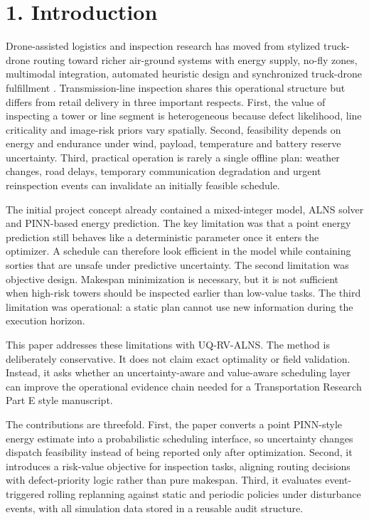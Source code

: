 \documentclass[preprint,12pt]{elsarticle}
\begin{document}
\section{1. Introduction}

Drone-assisted logistics and inspection research has moved from stylized truck-drone routing toward richer air-ground systems with energy supply, no-fly zones, multimodal integration, automated heuristic design and synchronized truck-drone fulfillment \cite{kim2026bidirectional,liu2026evtol,zhang2026airground,shi2026llm,yang2025integrated}. Transmission-line inspection shares this operational structure but differs from retail delivery in three important respects. First, the value of inspecting a tower or line segment is heterogeneous because defect likelihood, line criticality and image-risk priors vary spatially. Second, feasibility depends on energy and endurance under wind, payload, temperature and battery reserve uncertainty. Third, practical operation is rarely a single offline plan: weather changes, road delays, temporary communication degradation and urgent reinspection events can invalidate an initially feasible schedule.

The initial project concept already contained a mixed-integer model, ALNS solver and PINN-based energy prediction. The key limitation was that a point energy prediction still behaves like a deterministic parameter once it enters the optimizer. A schedule can therefore look efficient in the model while containing sorties that are unsafe under predictive uncertainty. The second limitation was objective design. Makespan minimization is necessary, but it is not sufficient when high-risk towers should be inspected earlier than low-value tasks. The third limitation was operational: a static plan cannot use new information during the execution horizon.

This paper addresses these limitations with UQ-RV-ALNS. The method is deliberately conservative. It does not claim exact optimality or field validation. Instead, it asks whether an uncertainty-aware and value-aware scheduling layer can improve the operational evidence chain needed for a Transportation Research Part E style manuscript.

The contributions are threefold. First, the paper converts a point PINN-style energy estimate into a probabilistic scheduling interface, so uncertainty changes dispatch feasibility instead of being reported only after optimization. Second, it introduces a risk-value objective for inspection tasks, aligning routing decisions with defect-priority logic rather than pure makespan. Third, it evaluates event-triggered rolling replanning against static and periodic policies under disturbance events, with all simulation data stored in a reusable audit structure.
\end{document}
